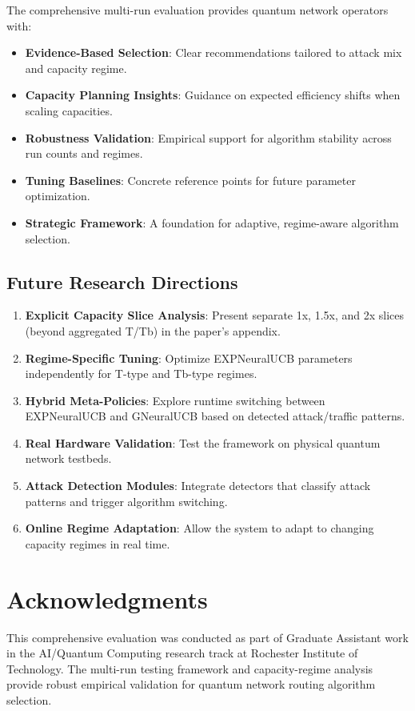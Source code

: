\documentclass[11pt,a4paper]{article}
\begin{document}
The comprehensive multi-run evaluation provides quantum network operators with:

\begin{itemize}
\item \textbf{Evidence-Based Selection}: Clear recommendations tailored to attack mix and capacity regime.
\item \textbf{Capacity Planning Insights}: Guidance on expected efficiency shifts when scaling capacities.
\item \textbf{Robustness Validation}: Empirical support for algorithm stability across run counts and regimes.
\item \textbf{Tuning Baselines}: Concrete reference points for future parameter optimization.
\item \textbf{Strategic Framework}: A foundation for adaptive, regime-aware algorithm selection.
\end{itemize}

\subsection{Future Research Directions}

\begin{enumerate}
\item \textbf{Explicit Capacity Slice Analysis}: Present separate 1x, 1.5x, and 2x slices (beyond aggregated T/Tb) in the paper’s appendix.
\item \textbf{Regime-Specific Tuning}: Optimize EXPNeuralUCB parameters independently for T-type and Tb-type regimes.
\item \textbf{Hybrid Meta-Policies}: Explore runtime switching between EXPNeuralUCB and GNeuralUCB based on detected attack/traffic patterns.
\item \textbf{Real Hardware Validation}: Test the framework on physical quantum network testbeds.
\item \textbf{Attack Detection Modules}: Integrate detectors that classify attack patterns and trigger algorithm switching.
\item \textbf{Online Regime Adaptation}: Allow the system to adapt to changing capacity regimes in real time.
\end{enumerate}

\section{Acknowledgments}

This comprehensive evaluation was conducted as part of Graduate Assistant work in the AI/Quantum Computing research track at Rochester Institute of Technology. The multi-run testing framework and capacity-regime analysis provide robust empirical validation for quantum network routing algorithm selection.
\end{document}
